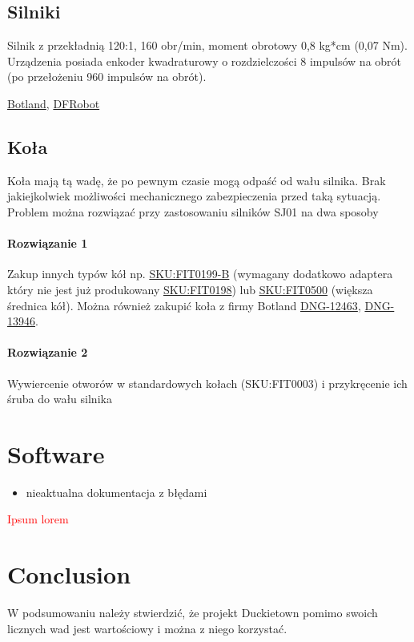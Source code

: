 \documentclass{svproc}
\begin{document}
\subsection{Silniki}
Silnik z przekładnią 120:1, 160 obr/min, moment obrotowy 0,8 kg*cm (0,07 Nm). Urządzenia posiada enkoder kwadraturowy o rozdzielczości 8 impulsów na obrót (po przełożeniu 960 impulsów na obrót).

\href{https://botland.com.pl/silniki-dc-z-przekladnia-i-enkoderami/6287-silnik-z-przekladnia-sj01-120-1-6v-160rpm-enkoder-5904422306793.html}{Botland}, \href{https://www.dfrobot.com/product-1457.html}{DFRobot}

\subsection{Koła}
Koła mają tą wadę, że po pewnym czasie mogą odpaść od wału silnika. Brak jakiejkolwiek możliwości mechanicznego zabezpieczenia przed taką sytuacją. Problem można rozwiązać przy zastosowaniu silników SJ01 na dwa sposoby
\paragraph{Rozwiązanie 1}
Zakup innych typów kół np. \href{https://www.dfrobot.com/product-652.html}{SKU:FIT0199-B} (wymagany dodatkowo  adaptera który nie jest już produkowany \href{https://www.dfrobot.com/product-645.html}{SKU:FIT0198}) lub \href{https://www.dfrobot.com/product-1535.html}{SKU:FIT0500} (większa średnica kół). Można również zakupić koła z firmy Botland \href{https://botland.com.pl/kola-z-oponami/12463-kolo-65x15-mm-biale-5903351248143.html}{DNG-12463}, \href{https://botland.com.pl/kola-z-oponami/13946-kolo-z-opona-65x13mm-biale-5903351248174.html}{DNG-13946}.

\paragraph{Rozwiązanie 2}
Wywiercenie otworów w standardowych kołach (SKU:FIT0003) i przykręcenie ich śruba do wału silnika

\section{Software}
\begin{itemize}
	\item nieaktualna dokumentacja z błędami
\end{itemize}

%
\textcolor{red}{
Ipsum lorem}

\section{Conclusion}
W podsumowaniu należy stwierdzić, że projekt Duckietown pomimo swoich licznych wad jest wartościowy i można z niego korzystać.



\end{document}
